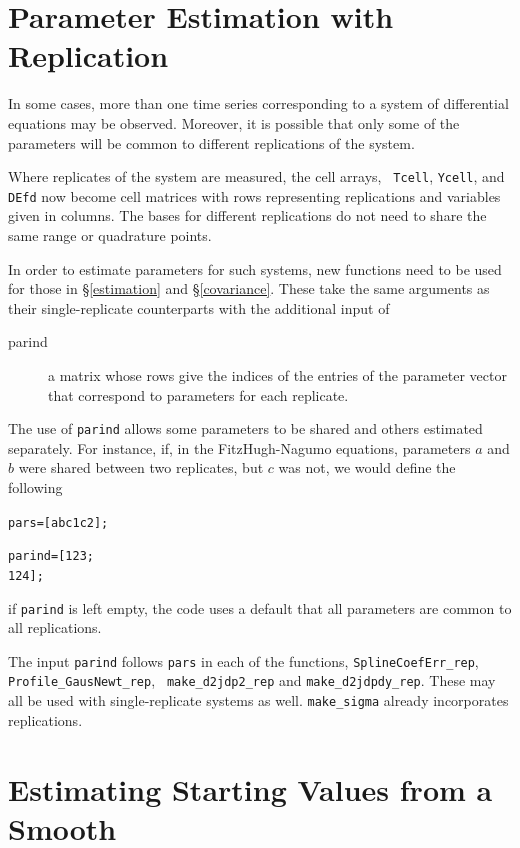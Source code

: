 \documentclass{article}
\newcommand{\nt}    {\noindent}
\begin{document}
\section{Parameter Estimation with Replication} \label{replications}

In some cases, more than one time series corresponding to a system of
differential equations may be observed. Moreover, it is possible that
only some of the parameters will be common to different replications
of the system.

Where replicates of the system are measured, the cell arrays, {\tt
  Tcell}, {\tt Ycell}, and {\tt DEfd} now become cell matrices
with rows representing replications and variables given in columns. The bases for different
replications do not need to share the same range or quadrature points.

In order to estimate parameters for such systems, new functions need
to be used for those in \S\ref{estimation} and
\S\ref{covariance}. These take the same arguments as their
single-replicate counterparts with the additional input of

\begin{description}
\item[parind] a matrix whose rows give the indices of the entries of the
  parameter vector that correspond to parameters for each replicate.
\end{description}

\nt The use of {\tt parind} allows some parameters to be shared and
others estimated separately. For instance, if, in the FitzHugh-Nagumo
equations, parameters $a$ and $b$ were shared between two replicates,
but $c$ was not, we would define the following

\begin{alltt}
   pars = [a b c1 c2];

   parind = [1 2 3;
             1 2 4];
\end{alltt}

\nt if {\tt parind} is left empty, the code uses a default
that all parameters are common to all replications.

 The input {\tt parind} follows {\tt pars} in each of the
functions, {\tt SplineCoefErr\_rep}, {\tt Profile\_GausNewt\_rep}, {\tt
  make\_d2jdp2\_rep} and {\tt make\_d2jdpdy\_rep}. These may all be used
with single-replicate systems as well.
{\tt make\_sigma} already incorporates replications.


\section{Estimating Starting Values from a Smooth} \label{variations}
\end{document}
